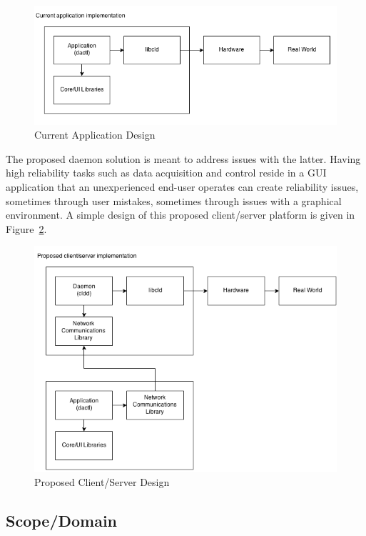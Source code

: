 \documentclass[11pt]{article}
\begin{document}
    \begin{figure}[H]
      \centering
      \includegraphics[scale=.6]{figures/dactl-current-layout.png}
      \caption{Current Application Design}
      \label{fig:layout-dactl}
    \end{figure}

    The proposed daemon solution is meant to address issues with the latter.
    Having high reliability tasks such as data acquisition and control reside in
    a GUI application that an unexperienced end-user operates can create reliability
    issues, sometimes through user mistakes, sometimes through issues with a
    graphical environment. A simple design of this proposed client/server
    platform is given in Figure~\ref{fig:layout-proposed-dcs}.

    \begin{figure}[H]
      \centering
      \includegraphics[scale=.6]{figures/dcs-proposed-layout.png}
      \caption{Proposed Client/Server Design}
      \label{fig:layout-proposed-dcs}
    \end{figure}

    \subsection{Scope/Domain}\label{sec:desc-domain}
\end{document}
